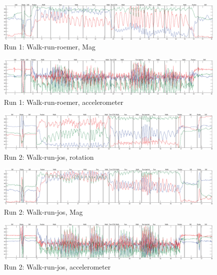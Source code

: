\begin{figure}
\centering
  \includegraphics[width=1\textwidth]{./Figures/chapter6/data_collection/run-1-walk-run-roemer/data_plot_mag_annotated.eps}
  \caption[R1: mag]{Run 1: Walk-run-roemer, Mag}
\end{figure}

\begin{figure}
\centering
  \includegraphics[width=1\textwidth]{./Figures/chapter6/data_collection/run-1-walk-run-roemer/data_plot_acc_annotated.eps}
  \caption[R1: accelerometer]{Run 1: Walk-run-roemer, accelerometer}
\end{figure}

\begin{figure}
\centering
  \includegraphics[width=1\textwidth]{./Figures/chapter6/data_collection/run-2-walk-run-jos/data_plot_rot_annotated.eps}
  \caption[R2: rotation]{Run 2: Walk-run-jos, rotation}
\end{figure}

\begin{figure}
\centering
  \includegraphics[width=1\textwidth]{./Figures/chapter6/data_collection/run-2-walk-run-jos/data_plot_mag_annotated.eps}
  \caption[R2: mag]{Run 2: Walk-run-jos, Mag}
\end{figure}

\begin{figure}
\centering
  \includegraphics[width=1\textwidth]{./Figures/chapter6/data_collection/run-2-walk-run-jos/data_plot_acc_annotated.eps}
  \caption[R2: accelerometer]{Run 2: Walk-run-jos, accelerometer}
\end{figure}